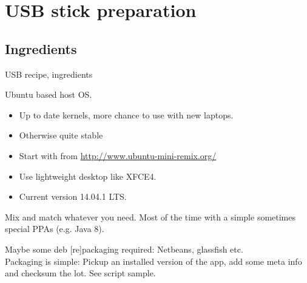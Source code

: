 \section[The cooking]{USB stick preparation}
\subsection{Ingredients}
\begin{frame}{USB recipe, ingredients}
  \begin{description}[short]
  \item[Distribution] Ubuntu based host OS.
    \begin{itemize}
    \item Up to date kernels, more chance to use with new laptops.
    \item Otherwise quite stable
    \item Start with  from
      \url{http://www.ubuntu-mini-remix.org/}
    \item Use lightweight desktop like XFCE4.
    \item Current version 14.04.1 LTS.
    \end{itemize}
  \item[Apps]  Mix and match whatever you need. Most of the time with a
    simple  sometimes special PPAs (e.g. Java 8).
  \item[Home grown packages] Maybe some deb [re]packaging required:
    Netbeans, glassfish etc.\\
    Packaging is simple: Pickup an installed version of the app, add some meta
    info and checksum the lot. See script sample.
  \end{description}
\end{frame}

